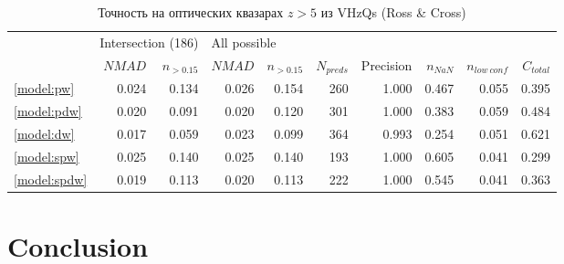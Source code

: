 \documentclass[fleqn,usenatbib]{mnras}
\begin{document}
\begin{table}
	\begin{tabular}{lrrrrrrrrr}
            \hline
            {} & \multicolumn{2}{l}{Intersection (186)} & \multicolumn{7}{l}{All possible} \\
            {} &             $NMAD$ & $n_{>0.15}$ &       $NMAD$ & $n_{>0.15}$ & $N_{preds}$ & Precision & $n_{NaN}$ & $n_{low~conf}$ & $C_{total}$ \\
            \hline
            \ref{model:pw}   &              0.024 &       0.134 &        0.026 &       0.154 &         260 &     1.000 &     0.467 &          0.055 &       0.395 \\
            \ref{model:pdw}  &              0.020 &       0.091 &        0.020 &       0.120 &         301 &     1.000 &     0.383 &          0.059 &       0.484 \\
            \ref{model:dw}   &              0.017 &       0.059 &        0.023 &       0.099 &         364 &     0.993 &     0.254 &          0.051 &       0.621 \\
            \ref{model:spw}  &              0.025 &       0.140 &        0.025 &       0.140 &         193 &     1.000 &     0.605 &          0.041 &       0.299 \\
            \ref{model:spdw} &              0.019 &       0.113 &        0.020 &       0.113 &         222 &     1.000 &     0.545 &          0.041 &       0.363 \\
            \hline
            \end{tabular}
            \caption{Точность на оптических квазарах $z>5$ из  VHzQs (Ross \& Cross)}
\end{table}



\section{Conclusion}\label{sec:conclusion}

\end{document}
